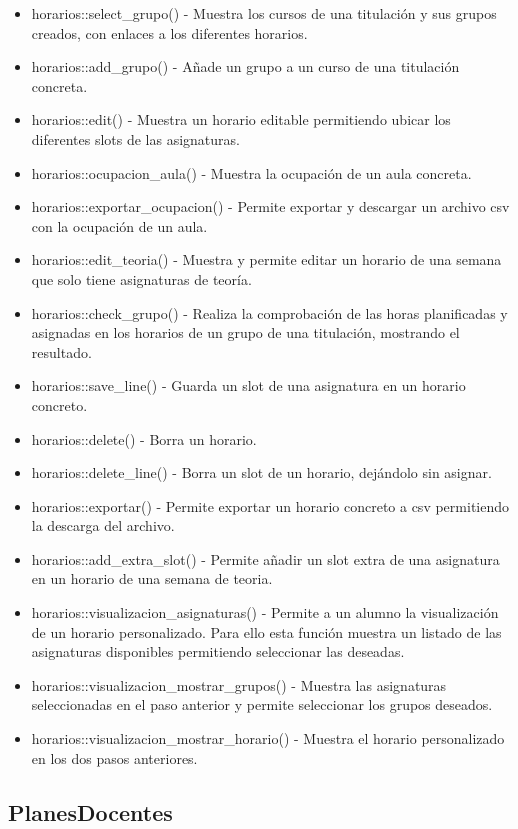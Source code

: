 \begin{itemize}
\item horarios::select\_grupo() - Muestra los cursos de una titulación y sus grupos creados, con enlaces a los diferentes horarios.
\item horarios::add\_grupo() - Añade un grupo a un curso de una titulación concreta.
\item horarios::edit() - Muestra un horario editable permitiendo ubicar los diferentes slots de las asignaturas.
\item horarios::ocupacion\_aula() - Muestra la ocupación de un aula concreta.
\item horarios::exportar\_ocupacion() - Permite exportar y descargar un archivo csv con la ocupación de un aula.
\item horarios::edit\_teoria() - Muestra y permite editar un horario de una semana que solo tiene asignaturas de teoría.
\item horarios::check\_grupo() - Realiza la comprobación de las horas planificadas y asignadas en los horarios de un grupo de una titulación, mostrando el resultado.
\item horarios::save\_line() - Guarda un slot de una asignatura en un horario concreto.
\item horarios::delete() - Borra un horario.
\item horarios::delete\_line() - Borra un slot de un horario, dejándolo sin asignar.
\item horarios::exportar() - Permite exportar un horario concreto a csv permitiendo la descarga del archivo.
\item horarios::add\_extra\_slot() - Permite añadir un slot extra de una asignatura en un horario de una semana de teoria.
\item horarios::visualizacion\_asignaturas() - Permite a un alumno la visualización de un horario personalizado. Para ello esta función muestra un listado de las asignaturas disponibles permitiendo seleccionar las deseadas.
\item horarios::visualizacion\_mostrar\_grupos() - Muestra las asignaturas seleccionadas en el paso anterior y permite seleccionar los grupos deseados.
\item horarios::visualizacion\_mostrar\_horario() - Muestra el horario personalizado en los dos pasos anteriores.
\end{itemize}


\subsection{PlanesDocentes}

